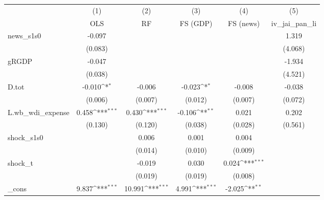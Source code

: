{
\def\sym#1{\ifmmode^{#1}\else\(^{#1}\)\fi}
\begin{tabular}{l*{5}{c}}
\toprule
            &\multicolumn{1}{c}{(1)}&\multicolumn{1}{c}{(2)}&\multicolumn{1}{c}{(3)}&\multicolumn{1}{c}{(4)}&\multicolumn{1}{c}{(5)}\\
            &\multicolumn{1}{c}{OLS}&\multicolumn{1}{c}{RF}&\multicolumn{1}{c}{FS (GDP)}&\multicolumn{1}{c}{FS (news)}&\multicolumn{1}{c}{iv\_jai\_pan\_li}\\
\midrule
news\_s1s0   &      -0.097         &                     &                     &                     &       1.319         \\
            &     (0.083)         &                     &                     &                     &     (4.068)         \\
\addlinespace
gRGDP       &      -0.047         &                     &                     &                     &      -1.934         \\
            &     (0.038)         &                     &                     &                     &     (4.521)         \\
\addlinespace
D.tot       &      -0.010\sym{*}  &      -0.006         &      -0.023\sym{*}  &      -0.008         &      -0.038         \\
            &     (0.006)         &     (0.007)         &     (0.012)         &     (0.007)         &     (0.072)         \\
\addlinespace
L.wb\_wdi\_expense&       0.458\sym{***}&       0.430\sym{***}&      -0.106\sym{**} &       0.021         &       0.202         \\
            &     (0.130)         &     (0.120)         &     (0.038)         &     (0.028)         &     (0.561)         \\
\addlinespace
shock\_s1s0  &                     &       0.006         &       0.001         &       0.004         &                     \\
            &                     &     (0.014)         &     (0.010)         &     (0.009)         &                     \\
\addlinespace
shock\_t     &                     &      -0.019         &       0.030         &       0.024\sym{***}&                     \\
            &                     &     (0.019)         &     (0.019)         &     (0.008)         &                     \\
\addlinespace
\_cons      &       9.837\sym{***}&      10.991\sym{***}&       4.991\sym{***}&      -2.025\sym{**} &                     \\

\end{tabular}}
